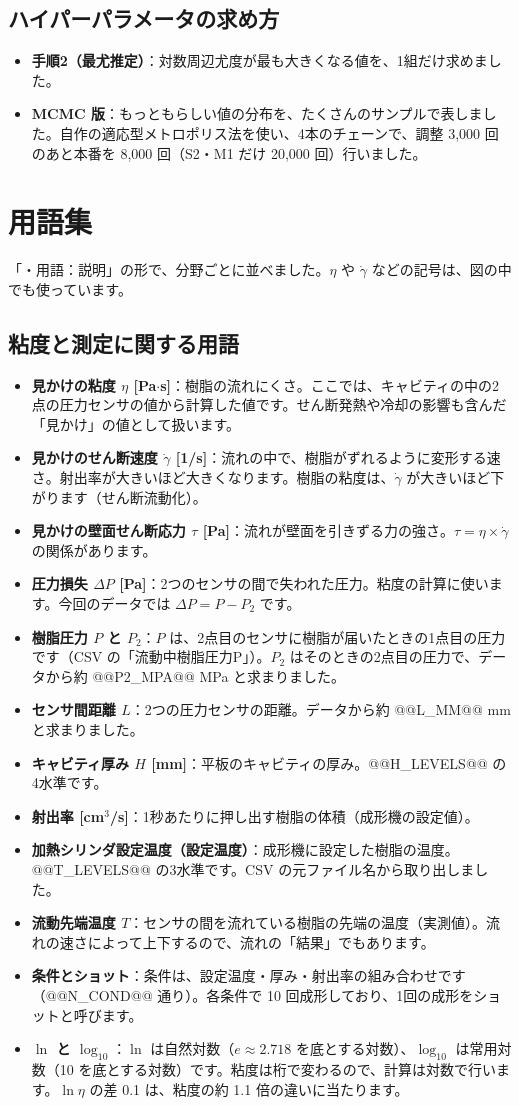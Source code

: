 \documentclass[paper=a4paper,fontsize=10.5pt,line_length=44zw,number_of_lines=38]{jlreq}
\newcommand{\gd}{\dot{\gamma}}
\newenvironment{termlist}{\begin{itemize}[label=・,leftmargin=1\zw,labelwidth=1\zw,labelsep=0pt,itemsep=0.4ex,topsep=0.6ex,parsep=0pt]}{\end{itemize}}
\newcommand{\term}[1]{\item \textbf{#1}：}
\newenvironment{points}{\begin{itemize}[label=$\triangleright$,leftmargin=1.5\zw,itemsep=0.3ex,topsep=0.5ex,parsep=0pt]}{\end{itemize}}
\newcommand{\pt}[1]{\item \textbf{#1}：}
\begin{document}
\subsection{ハイパーパラメータの求め方}
\begin{points}
\pt{手順2（最尤推定）}対数周辺尤度が最も大きくなる値を、1組だけ求めました。
\pt{MCMC 版}もっともらしい値の分布を、たくさんのサンプルで表しました。自作の適応型メトロポリス法を使い、4本のチェーンで、調整 3,000 回のあと本番を 8,000 回（S2・M1 だけ 20,000 回）行いました。
\end{points}

\section{用語集}

「・用語：説明」の形で、分野ごとに並べました。$\eta$ や $\gd$ などの記号は、図の中でも使っています。

\subsection{粘度と測定に関する用語}
\begin{termlist}
\term{見かけの粘度 $\eta$ [Pa$\cdot$s]}樹脂の流れにくさ。ここでは、キャビティの中の2点の圧力センサの値から計算した値です。せん断発熱や冷却の影響も含んだ「見かけ」の値として扱います。
\term{見かけのせん断速度 $\gd$ [1/s]}流れの中で、樹脂がずれるように変形する速さ。射出率が大きいほど大きくなります。樹脂の粘度は、$\gd$ が大きいほど下がります（せん断流動化）。
\term{見かけの壁面せん断応力 $\tau$ [Pa]}流れが壁面を引きずる力の強さ。$\tau = \eta \times \gd$ の関係があります。
\term{圧力損失 $\Delta P$ [Pa]}2つのセンサの間で失われた圧力。粘度の計算に使います。今回のデータでは $\Delta P = P - P_2$ です。
\term{樹脂圧力 $P$ と $P_2$}$P$ は、2点目のセンサに樹脂が届いたときの1点目の圧力です（CSV の「流動中樹脂圧力P」）。$P_2$ はそのときの2点目の圧力で、データから約 @@P2_MPA@@ MPa と求まりました。
\term{センサ間距離 $L$}2つの圧力センサの距離。データから約 @@L_MM@@ mm と求まりました。
\term{キャビティ厚み $H$ [mm]}平板のキャビティの厚み。@@H_LEVELS@@ の4水準です。
\term{射出率 [cm$^3$/s]}1秒あたりに押し出す樹脂の体積（成形機の設定値）。
\term{加熱シリンダ設定温度（設定温度）}成形機に設定した樹脂の温度。@@T_LEVELS@@ の3水準です。CSV の元ファイル名から取り出しました。
\term{流動先端温度 $T$}センサの間を流れている樹脂の先端の温度（実測値）。流れの速さによって上下するので、流れの「結果」でもあります。
\term{条件とショット}条件は、設定温度・厚み・射出率の組み合わせです（@@N_COND@@ 通り）。各条件で 10 回成形しており、1回の成形をショットと呼びます。
\term{$\ln$ と $\log_{10}$}$\ln$ は自然対数（$e \approx 2.718$ を底とする対数）、$\log_{10}$ は常用対数（10 を底とする対数）です。粘度は桁で変わるので、計算は対数で行います。$\ln\eta$ の差 0.1 は、粘度の約 1.1 倍の違いに当たります。
\end{termlist}
\end{document}
